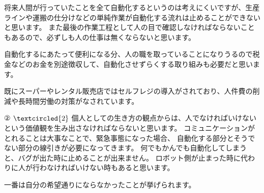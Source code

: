 \documentclass[11pt,a4paper]{jsarticle}
\begin{document}
将来人間が行っていたことを全て自動化するというのは考えにくいですが、生産ラインや運搬の仕分けなどの単純作業が自動化する流れは止めることができないと思います。
また最後の作業工程として人の目で確認しなければならないこともあるので、必ずしも人の仕事は無くならないと思います。

自動化するにあたって便利になる分、人の職を取っていることになりうるので税金などのお金を別途徴収して、自動化させずらくする取り組みも必要だと思います。

既にスーパーやレンタル販売店ではセルフレジの導入がされており、人件費の削減や長時間労働の対策がなされています。

②
$ \textcircled{\scriptsize2} $
個人としての生き方の観点からは、人でなければいけないという価値観を生み出さなければならないと思います。
コミュニケーションがとれることは大事なことで、緊急事態になった場合、
自動化する部分とそうでない部分の線引きが必要になってきます。
何でもかんでも自動化してしまうと、バグが出た時に止めることが出来ません。
ロボット側が止まった時に代わりに人が行わなければいけない時もあると思います。

一番は自分の希望通りにならなかったことが挙げられます。
\end{document}

